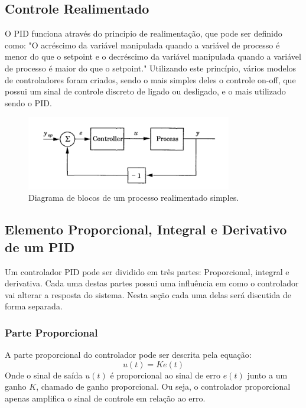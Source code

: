 \subsection{Controle Realimentado}
O PID funciona através do principio de realimentação, que pode ser definido como: "O acréscimo da variável manipulada quando a variável de processo é menor do que o setpoint e o decréscimo da variável manipulada quando a variável de processo é maior do que o setpoint."  Utilizando este princípio, vários modelos de controladores foram criados, sendo o mais simples deles o controle on-off, que possui um sinal de controle discreto de ligado ou desligado, e o mais utilizado sendo o PID. \cite{astrom1995}

\begin{figure}[ht]
    \centering
    \includegraphics[width=0.8\textwidth]{capitulos/processo_feedback.png}
    \caption{Diagrama de blocos de um processo realimentado simples. \cite{astrom1995}}
    \label{fig:processo_feedback}
\end{figure}
\subsection{Elemento Proporcional, Integral e Derivativo de um PID}
Um controlador PID pode ser dividido em três partes: Proporcional, integral e derivativa. Cada uma destas partes possui uma influência em como o controlador vai alterar a resposta do sistema. \cite{ogata2011engenharia} Nesta seção cada uma delas será discutida de forma separada.
\subsubsection{Parte Proporcional}
A parte proporcional do controlador pode ser descrita pela equação: 
\begin{equation}
    u(t) = K e(t)
\end{equation}
Onde o sinal de saída $u(t)$ é proporcional ao sinal de erro $e(t)$ junto a um ganho $K$, chamado de ganho proporcional. Ou seja, o controlador proporcional apenas amplifica o sinal de controle em relação ao erro. \cite{ogata2011engenharia}

